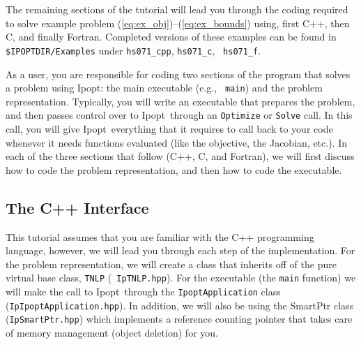 \documentclass[letter,10pt]{article}
\newcommand{\Ipopt}{{\sc Ipopt}}
\begin{document}
\vspace{\baselineskip}

The remaining sections of the tutorial will lead you through
the coding required to solve example problem
(\ref{eq:ex_obj})--(\ref{eq:ex_bounds}) using, first C++, then C, and finally
Fortran. Completed versions of these examples can be found in {\tt
\$IPOPTDIR/Examples} under {\tt hs071\_cpp}, {\tt hs071\_c}, {\tt
hs071\_f}.

As a user, you are responsible for coding two sections of the program
that solves a problem using \Ipopt: the main executable (e.g., {\tt
  main}) and the problem representation.  Typically, you will write an
executable that prepares the problem, and then passes control over to
\Ipopt\ through an {\tt Optimize} or {\tt Solve} call. In this call,
you will give \Ipopt\ everything that it requires to call back to your
code whenever it needs functions evaluated (like the objective, the
Jacobian, etc.).  In each of the three sections that follow (C++, C,
and Fortran), we will first discuss how to code the problem
representation, and then how to code the executable.

\subsection{The C++ Interface}
This tutorial assumes that you are familiar with the C++ programming
language, however, we will lead you through each step of the
implementation. For the problem representation, we will create a class
that inherits off of the pure virtual base class, {\tt TNLP} ({\tt
  IpTNLP.hpp}). For the executable (the {\tt main} function) we will
make the call to \Ipopt\ through the {\tt IpoptApplication} class
({\tt IpIpoptApplication.hpp}). In addition, we will also be using the
SmartPtr class ({\tt IpSmartPtr.hpp}) which implements a reference
counting pointer that takes care of memory management (object
deletion) for you.
\end{document}
